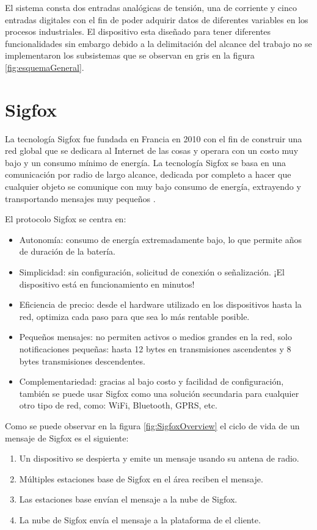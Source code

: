El sistema consta dos entradas analógicas de tensión, una de corriente y cinco entradas digitales con el fin de poder adquirir datos de diferentes variables en los procesos industriales. El dispositivo esta diseñado para tener diferentes funcionalidades sin embargo debido a la delimitación del alcance del trabajo no se implementaron los subsistemas que se observan en gris en la figura \ref{fig:esquemaGeneral}.

\section{Sigfox}
La tecnología Sigfox fue fundada en Francia en 2010 con el fin de construir una red global que se dedicara al Internet de las cosas y operara con un costo muy bajo y un consumo mínimo de energía. La tecnología Sigfox se basa en una comunicación por radio de largo alcance, dedicada por completo a hacer que cualquier objeto se comunique con muy bajo consumo de energía, extrayendo y transportando mensajes muy pequeños \cite{SigfoxGlobalNetwork}.

El protocolo Sigfox se centra en: 
\begin{itemize}
    \item Autonomía: consumo de energía extremadamente bajo, lo que permite años de duración de la batería.
    \item Simplicidad:  sin configuración, solicitud de conexión o señalización. ¡El dispositivo está en funcionamiento en minutos!
    \item Eficiencia de precio: desde el hardware utilizado en los dispositivos hasta la red, optimiza cada paso para que sea lo más rentable posible.
    \item Pequeños mensajes: no permiten activos o medios grandes en la red, solo notificaciones pequeñas: hasta 12 bytes en transmisiones ascendentes y 8 bytes transmisiones descendentes.
    \item Complementariedad: gracias al bajo costo y facilidad de configuración, también se puede usar Sigfox como una solución secundaria para cualquier otro tipo de red, como: WiFi, Bluetooth, GPRS, etc.
\end{itemize}

Como se puede observar en la figura \ref{fig:SigfoxOverview} el ciclo de vida de un mensaje de Sigfox es el siguiente:
\begin{enumerate}
    \item Un dispositivo se despierta y emite un mensaje usando su antena de radio.
    \item Múltiples estaciones base de Sigfox en el área reciben el mensaje.
    \item Las estaciones base envían el mensaje a la nube de Sigfox.
    \item La nube de Sigfox envía el mensaje a la plataforma de el cliente.
\end{enumerate}

